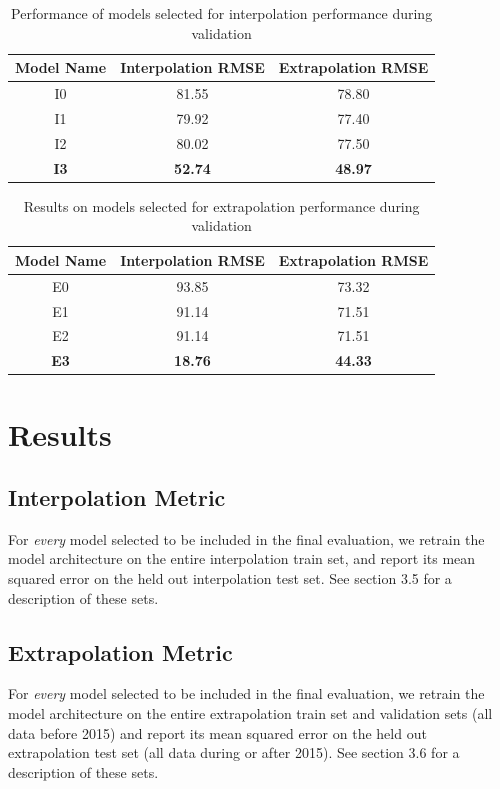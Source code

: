 \documentclass{article}
\begin{document}
\begin{table}[h!]
\begin{center}
\begin{tabular}{ |c|c|c| } 
 \hline
 Model Name & Interpolation RMSE & Extrapolation RMSE \\ 
 \hline
I0 & 81.55 & 78.80 \\
I1 & 79.92 & 77.40 \\
I2 & 80.02 & 77.50 \\
\textbf{I3} & \textbf{52.74} & \textbf{48.97} \\
 \hline
\end{tabular}
\end{center}
\caption{Performance of models selected for interpolation  performance during validation}
\end{table}

\begin{table}[h!]
\begin{center}
\begin{tabular}{ |c|c|c| } 
 \hline
 Model Name & Interpolation RMSE & Extrapolation RMSE \\ 
 \hline
E0 & 93.85 & 73.32 \\
E1 & 91.14 & 71.51 \\
E2 & 91.14 & 71.51 \\
\textbf{E3} & \textbf{18.76} & \textbf{44.33} \\
 \hline
\end{tabular}
\end{center}
\caption{Results on models selected for extrapolation performance during validation}
\end{table}

\section{Results} 
\subsection{Interpolation Metric}
For \textit{every} model selected to be included in the final evaluation, we retrain the model architecture on the entire interpolation train set, and report its mean squared error on the held out interpolation test set. See section 3.5 for a description of these sets. 

\subsection{Extrapolation Metric}
For \textit{every} model selected to be included in the final evaluation, we retrain the model architecture on the entire extrapolation train set and validation sets (all data before 2015) and report its mean squared error on the held out extrapolation test set (all data during or after 2015). See section 3.6 for a description of these sets. 
\end{document}
